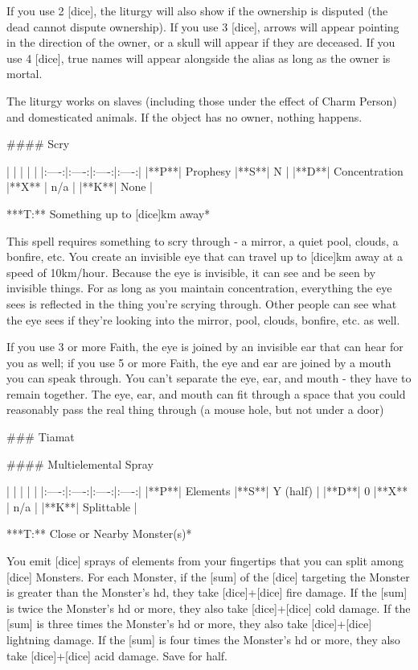 If you use 2 [dice], the liturgy will also show if the ownership is disputed (the dead cannot dispute ownership).  If you use 3 [dice], arrows will appear pointing in the direction of the owner, or a skull will appear if they are deceased.  If you use 4 [dice], true names will appear alongside the alias as long as the owner is mortal.

The liturgy works on slaves (including those under the effect of Charm Person) and domesticated animals.  If the object has no owner, nothing happens.




#### Scry

| | | | |
|:----:|:----:|:----:|:----:|
|**P**| Prophesy |**S**|  N |
|**D**| Concentration |**X** |  n/a  |
|**K**| None |


***T:**   Something up to [dice]km away*



This spell requires something to scry through - a mirror, a quiet pool, clouds, a bonfire, etc.  You create an invisible eye that can travel up to [dice]km away at a speed of 10km/hour.  Because the eye is invisible, it can see and be seen by invisible things.  For as long as you maintain concentration, everything the eye sees is reflected in the thing you're scrying through.  Other people can see what the eye sees if they're looking into the mirror, pool, clouds, bonfire, etc.  as well. 

If you use 3 or more Faith, the eye is joined by an invisible ear that can hear for you as well; if you use 5 or more Faith, the eye and ear are joined by a mouth you can speak through.  You can't separate the eye, ear, and mouth - they have to remain together.  The eye, ear, and mouth can fit through a space that you could reasonably pass the real thing through (a mouse hole, but not under a door)


### Tiamat





#### Multielemental Spray

| | | | |
|:----:|:----:|:----:|:----:|
|**P**| Elements |**S**|  Y (half) |
|**D**| 0 |**X** |  n/a  |
|**K**| Splittable |


***T:**   Close or Nearby Monster(s)*



You emit [dice] sprays of elements from your fingertips that you can split among [dice] Monsters.  For each Monster, if the [sum] of the [dice] targeting the Monster is greater than the Monster's {hd}, they take [dice]+[dice] fire damage.  If the [sum] is twice the Monster's {hd} or more, they also take [dice]+[dice] cold damage.  If the [sum] is three times the Monster's {hd} or more, they also take [dice]+[dice] lightning damage.  If the [sum] is four times the Monster's {hd} or more, they also take [dice]+[dice] acid damage.  Save for half.



